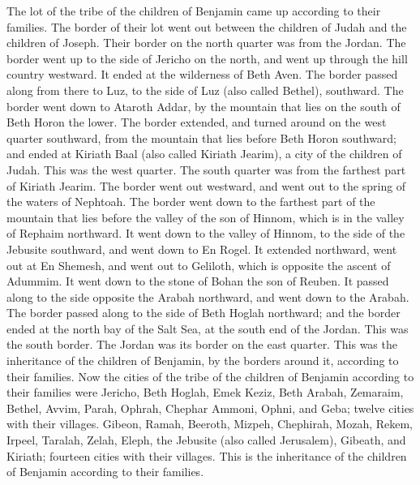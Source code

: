 \myverse{}The lot of the tribe of the children of Benjamin came up according
to their families. The border of their lot went out between the children of Judah and the children of
Joseph.
\myverse{}Their border on the north quarter was from the Jordan. The border went up
to the side of Jericho on the north, and went up through the hill country westward. It ended at the wilderness
of Beth Aven.
\myverse{}The border passed along from there to Luz, to the side of Luz (also called
Bethel), southward. The border went down to Ataroth Addar, by the mountain that lies on the south of Beth
Horon the lower.
\myverse{}The border extended, and turned around on the west quarter southward, from
the mountain that lies before Beth Horon southward; and ended at Kiriath Baal (also called Kiriath Jearim),
a city of the children of Judah. This was the west quarter.
\myverse{}The south quarter was from the farthest part of Kiriath Jearim. The border
went out westward, and went out to the spring of the waters of Nephtoah.
\myverse{}The border went down to the farthest part of the mountain that lies before
the valley of the son of Hinnom, which is in the valley of Rephaim northward. It went down to the valley
of Hinnom, to the side of the Jebusite southward, and went down to En Rogel.
\myverse{}It extended northward, went out at En Shemesh, and went out to Geliloth,
which is opposite the ascent of Adummim. It went down to the stone of Bohan the son of Reuben.
\myverse{}It passed along to the side opposite the Arabah northward, and went down
to the Arabah.
\myverse{}The border passed along to the side of Beth Hoglah northward; and the border
ended at the north bay of the Salt Sea, at the south end of the Jordan. This was the south border.
\myverse{}The Jordan was its border on the east quarter. This was the inheritance of
the children of Benjamin, by the borders around it, according to their families.
\myverse{}Now the cities of the tribe of the children of Benjamin according to their
families were Jericho, Beth Hoglah, Emek Keziz,
\myverse{}Beth Arabah, Zemaraim, Bethel,
\myverse{}Avvim, Parah, Ophrah,
\myverse{}Chephar Ammoni, Ophni, and Geba; twelve cities with their villages.
\myverse{}Gibeon, Ramah, Beeroth,
\myverse{}Mizpeh, Chephirah, Mozah,
\myverse{}Rekem, Irpeel, Taralah,
\myverse{}Zelah, Eleph, the Jebusite (also called Jerusalem), Gibeath, and Kiriath;
fourteen cities with their villages. This is the inheritance of the children of Benjamin according to
their families.


